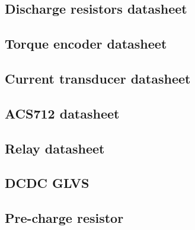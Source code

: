 
\subsection{Discharge resistors datasheet}\label{app:discharge_resistor_sheet}
	

\subsection{Torque encoder datasheet}\label{app:torque_encoder_datasheet}
	

\subsection{Current transducer datasheet}\label{app:bspd_lem_datasheet}
	

\subsection{ACS712 datasheet}\label{app:acs712_datasheet}
	

\subsection{Relay datasheet}\label{app:precharge_relay_datasheet}
	
	
\subsection{DCDC GLVS}\label{app:glvs_dcdc}
	

\subsection{Pre-charge resistor}\label{app:precharge_resistors}
	

